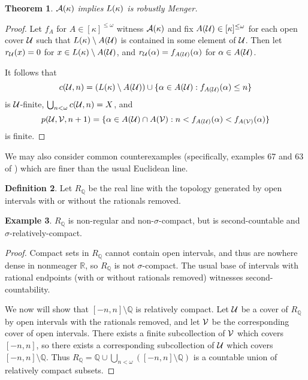 \documentclass{amsart}
\newtheorem{theorem}{Theorem}[section]
\theoremstyle{definition}
\newtheorem{definition}[theorem]{Definition}
\newtheorem{example}[theorem]{Example}
\begin{document}
\begin{theorem}
  \(\mathcal{A}(\kappa)\) implies \(L(\kappa)\) is
  robustly Menger.
\end{theorem}

\begin{proof}
  Let \(f_A\) for \(A\in[\kappa]^{\leq\omega}\) witness \(\mathcal{A}(\kappa)\) and fix
  \(A(\mathcal{U})\in[\kappa]^{\leq\omega}\) for each open cover \(\mathcal{U}\) such that
  \(L(\kappa)\setminus A(\mathcal{U})\) is contained in some element of
  \(\mathcal{U}\).
  Then let \(r_{\mathcal{U}}(x)=0\) for \(x\in L(\kappa)\setminus A(\mathcal{U})\),
  and \(r_{\mathcal{U}}(\alpha)=f_{A(\mathcal{U})}(\alpha)\) for \(\alpha\in A(\mathcal{U})\).

  It follows that
    \[
      c(\mathcal{U},n)
        =
      \left(L(\kappa)\setminus A(\mathcal{U})\right)
        \cup
      \{\alpha\in A(\mathcal{U}) : f_{A(\mathcal{U})}(\alpha)\leq n \}
    \]
  is \(\mathcal{U}\)-finite, \(\bigcup_{n<\omega}c(\mathcal{U},n)=X\), and
    \[
      p(\mathcal{U},\mathcal{V},n+1)
        =
      \{
        \alpha\in A(\mathcal{U})\cap A(\mathcal{V})
          :
        n < f_{A(\mathcal{U})}(\alpha) < f_{A(\mathcal{V})}(\alpha)
      \}
    \]
  is finite.
\end{proof}

We may also consider common counterexamples (specifically, examples
67 and 63 of \cite{MR1382863}) which are finer
than the usual Euclidean line.

\begin{definition}
  Let \(R_{\mathbb Q}\) be the real line with the topology generated by open
  intervals with or without the rationals removed.
\end{definition}

\begin{example}
  \(R_{\mathbb Q}\) is non-regular and non-\(\sigma\)-compact, but is
  second-countable and \(\sigma\)-relatively-compact.
\end{example}

\begin{proof}
  Compact sets in \(R_{\mathbb Q}\) cannot contain open intervals,
  and thus are nowhere dense in nonmeager \(\mathbb R\),
  so \(R_{\mathbb Q}\) is not \(\sigma\)-compact. The usual base of
  intervals with rational endpoints (with or without rationals removed)
  witnesses second-countability.

  We now will show that \([-n,n]\setminus\mathbb Q\) is relatively compact.
  Let \(\mathcal{U}\) be a cover of
  \(R_{\mathbb Q}\) by open intervals with the rationals removed,
  and let \(\mathcal{V}\) be the corresponding cover of open intervals.
  There exists a finite subcollection of \(\mathcal{V}\) which covers
  \([-n,n]\), so there exists a corresponding subcollection of
  \(\mathcal{U}\) which covers \([-n,n]\setminus\mathbb Q\).
  Thus
  \(R_{\mathbb Q}=\mathbb Q\cup\bigcup_{n<\omega}([-n,n]\setminus\mathbb Q)\)
  is a countable union of relatively compact subsets.
\end{proof}
\end{document}
